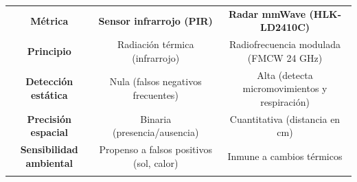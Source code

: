 \begin{table}[H]
    \centering
    \setlength{\tabcolsep}{4pt}
    \renewcommand{\arraystretch}{1.2}
    \begin{tabular}{|c|c|c|}
        \hhline{|-|-|-|}
        \rowcolor[gray]{0.9} 
        \parbox[c]{3.2cm}{\vspace{0.2cm}\centering\textbf{Métrica}\vspace{0.2cm}} & \parbox[c]{5.2cm}{\vspace{0.2cm}\centering\textbf{Sensor infrarrojo (PIR)}\vspace{0.2cm}} & \parbox[c]{5.2cm}{\vspace{0.2cm}\centering\textbf{Radar mmWave (HLK-LD2410C)}\vspace{0.2cm}} \\ \hhline{|-|-|-|}
        \parbox[c]{3.2cm}{\vspace{0.2cm}\centering\textbf{Principio}\vspace{0.2cm}} & \parbox[c]{5.2cm}{\vspace{0.2cm}\centering Radiación térmica (infrarrojo)\vspace{0.2cm}} & \parbox[c]{5.2cm}{\vspace{0.2cm}\centering Radiofrecuencia modulada (FMCW 24 GHz)\vspace{0.2cm}} \\ \hhline{|-|-|-|}
        \parbox[c]{3.2cm}{\vspace{0.2cm}\centering\textbf{Detección estática}\vspace{0.2cm}} & \parbox[c]{5.2cm}{\vspace{0.2cm}\centering Nula (falsos negativos frecuentes)\vspace{0.2cm}} & \parbox[c]{5.2cm}{\vspace{0.2cm}\centering Alta (detecta micromovimientos y respiración)\vspace{0.2cm}} \\ \hhline{|-|-|-|}
        \parbox[c]{3.2cm}{\vspace{0.2cm}\centering\textbf{Precisión espacial}\vspace{0.2cm}} & \parbox[c]{5.2cm}{\vspace{0.2cm}\centering Binaria (presencia/ausencia)\vspace{0.2cm}} & \parbox[c]{5.2cm}{\vspace{0.2cm}\centering Cuantitativa (distancia en cm)\vspace{0.2cm}} \\ \hhline{|-|-|-|}
        \parbox[c]{3.2cm}{\vspace{0.2cm}\centering\textbf{Sensibilidad ambiental}\vspace{0.2cm}} & \parbox[c]{5.2cm}{\vspace{0.2cm}\centering Propenso a falsos positivos (sol, calor)\vspace{0.2cm}} & \parbox[c]{5.2cm}{\vspace{0.2cm}\centering Inmune a cambios térmicos\vspace{0.2cm}} \\ \hhline{|-|-|-|}

\end{tabular}
\end{table}
